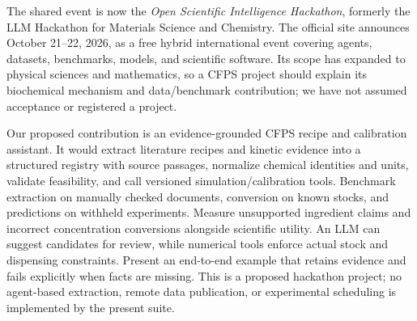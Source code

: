 The shared event is now the \emph{Open Scientific Intelligence Hackathon},
formerly the LLM Hackathon for Materials Science and Chemistry. The official
site announces October 21--22, 2026, as a free hybrid international event covering
agents, datasets, benchmarks, models, and scientific software\cite{osi}.
Its scope has expanded to physical sciences and mathematics, so a CFPS project
should explain its biochemical mechanism and data/benchmark contribution;
we have not assumed acceptance or registered a project.

Our proposed contribution is an evidence-grounded CFPS recipe and calibration
assistant. It would extract literature recipes and kinetic evidence into a
structured registry with source passages, normalize chemical identities and
units, validate feasibility, and call versioned simulation/calibration tools.
Benchmark extraction on manually checked documents, conversion on known stocks,
and predictions on withheld experiments. Measure unsupported ingredient claims
and incorrect concentration conversions alongside scientific utility. An LLM
can suggest candidates for review, while numerical tools enforce actual stock
and dispensing constraints. Present an end-to-end example that retains evidence
and fails explicitly when facts are missing. This is a proposed hackathon project;
no agent-based extraction, remote data publication, or experimental scheduling
is implemented by the present suite.
